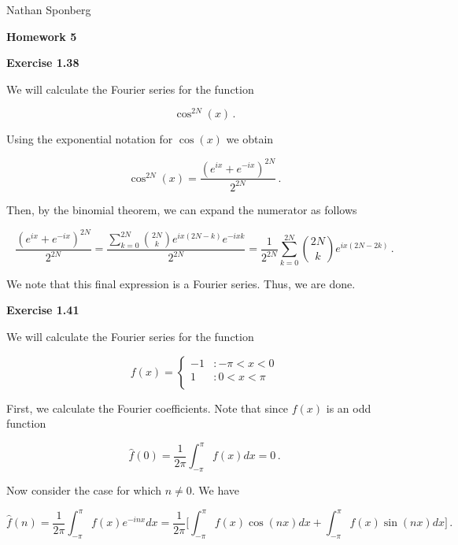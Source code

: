\documentclass[a4paper]{article}
\newcommand {\intg} [4] {\int_{#1}^{#2} #3 d#4}
\numberwithin{equation}{section}
\begin{document}
\begin{flushright}
{\small{Nathan Sponberg}}
\end{flushright}

\begin{center}
\bf{Homework 5}
\end{center}


\begin{description}

\item{\bf{Exercise 1.38}}\\

\item We will calculate the Fourier series for the function 

$$\cos^{2N}(x)\,.$$

Using the exponential notation for $\cos(x)$ we obtain

$$\cos^{2N}(x) = \frac{(e^{ix}+e^{-ix})^{2N}}{2^{2N}}\,.$$

Then, by the binomial theorem, we can expand the numerator as follows

$$\frac{(e^{ix}+e^{-ix})^{2N}}{2^{2N}} = \frac{\sum_{k=0}^{2N}{2N \choose k}e^{ix(2N-k)}e^{-ixk}}{2^{2N}} = \frac{1}{2^{2N}}\sum_{k=0}^{2N}{2N \choose k}e^{ix(2N-2k)}\,.$$

We note that this final expression is a Fourier series. Thus, we are done.

\item{\bf{Exercise 1.41}}\\

\item We will calculate the Fourier series for the function 

\begin{displaymath}
   f(x) = \left\{
     \begin{array}{ll}
       -1 & : -\pi < x < 0\\
       1 & : 0 < x < \pi\\
     \end{array}
   \right.
\end{displaymath} 

First, we calculate the Fourier coefficients. Note that since $f(x)$ is an odd function

$$\hat{f}(0) = \frac{1}{2\pi}\intg{-\pi}{\pi}{f(x)}{x} = 0\,.$$

Now consider the case for which $n \neq 0$. We have

$$\hat{f}(n) = \frac{1}{2\pi}\intg{-\pi}{\pi}{f(x)e^{-inx}}{x} = \frac{1}{2\pi}\Big[\intg{-\pi}{\pi}{f(x)\cos(nx)}{x} + \intg{-\pi}{\pi}{f(x)\sin(nx)}{x}\Big]\,.$$


\end{description}
\end{document}
